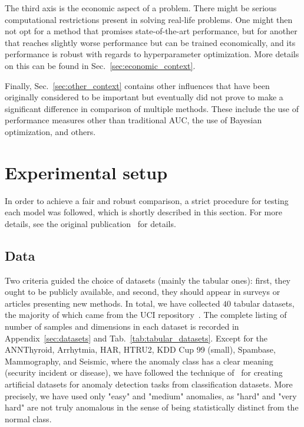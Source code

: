 The third axis is the economic aspect of a problem. There might be serious computational restrictions present in solving real-life problems. One might then not opt for a method that promises state-of-the-art performance, but for another that reaches slightly worse performance but can be trained economically, and its performance is robust with regards to hyperparameter optimization. More details on this can be found in Sec.~\ref{sec:economic_context}.

Finally, Sec.~\ref{sec:other_context} contains other influences that have been originally considered to be important but eventually did not prove to make a significant difference in comparison of multiple methods. These include the use of performance measures other than traditional AUC, the use of Bayesian optimization, and others. 

\section{Experimental setup}
\label{sec:experimentalsetup}

In order to achieve a fair and robust comparison, a strict procedure for testing each model was followed, which is shortly described in this section. For more details, see the original publication~\cite{vskvara2021comparison} for details.

\subsection{Data}

Two criteria guided the choice of datasets (mainly the tabular ones): first, they ought to be publicly available, and second, they should appear in surveys or articles presenting new methods.  In total, we have collected $40$ tabular datasets, the majority of which came from the UCI repository~\cite{Dua:2019}. The complete listing of number of samples and dimensions in each dataset is recorded in Appendix~\ref{sec:datasets} and Tab.~\ref{tab:tabular_datasets}. Except for the ANNThyroid, Arrhytmia, HAR, HTRU2, KDD Cup 99 (small), Spambase, Mammography, and Seismic, where the anomaly class has a clear meaning (security incident or disease), we have followed the technique of~\cite{emmott2013systematic} for creating artificial datasets for anomaly detection tasks from classification datasets. More precisely, we have used only "easy" and "medium" anomalies, as "hard" and "very hard" are not truly anomalous in the sense of being statistically distinct from the normal class.

